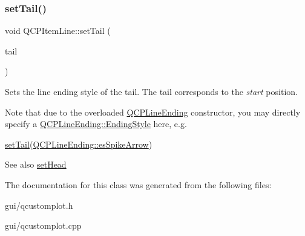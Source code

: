 \subsubsection{\texorpdfstring{set\+Tail()}{setTail()}}
{\footnotesize\ttfamily void Q\+C\+P\+Item\+Line\+::set\+Tail (\begin{DoxyParamCaption}\item[{const \hyperlink{classQCPLineEnding}{Q\+C\+P\+Line\+Ending} \&}]{tail }\end{DoxyParamCaption})}

Sets the line ending style of the tail. The tail corresponds to the {\itshape start} position.

Note that due to the overloaded \hyperlink{classQCPLineEnding}{Q\+C\+P\+Line\+Ending} constructor, you may directly specify a \hyperlink{classQCPLineEnding_a5ef16e6876b4b74959c7261d8d4c2cd5}{Q\+C\+P\+Line\+Ending\+::\+Ending\+Style} here, e.\+g.
\begin{DoxyCode}
\hyperlink{classQCPItemLine_ac264222c3297a7efe33df9345c811a5f}{setTail}(\hyperlink{classQCPLineEnding_a5ef16e6876b4b74959c7261d8d4c2cd5ab9964d0d03f812d1e79de15edbeb2cbf}{QCPLineEnding::esSpikeArrow}) 
\end{DoxyCode}


\begin{DoxySeeAlso}{See also}
\hyperlink{classQCPItemLine_aebf3d687114d584e0459db6759e2c3c3}{set\+Head} 
\end{DoxySeeAlso}


The documentation for this class was generated from the following files\+:\begin{DoxyCompactItemize}
\item 
gui/qcustomplot.\+h\item 
gui/qcustomplot.\+cpp\end{DoxyCompactItemize}

